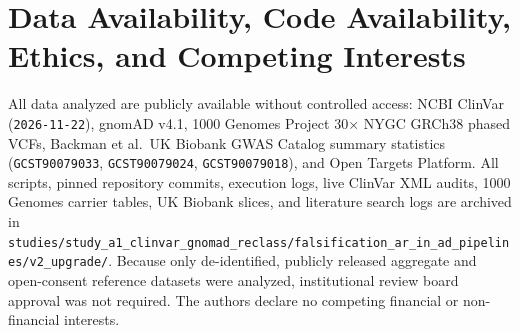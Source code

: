 \documentclass[11pt,letterpaper]{article}
\begin{document}
\section*{Data Availability, Code Availability, Ethics, and Competing Interests}
All data analyzed are publicly available without controlled access: NCBI ClinVar (\texttt{2026-11-22}), gnomAD v4.1, 1000 Genomes Project 30$\times$ NYGC GRCh38 phased VCFs, Backman et al.\ UK Biobank GWAS Catalog summary statistics (\texttt{GCST90079033}, \texttt{GCST90079024}, \texttt{GCST90079018}), and Open Targets Platform. All scripts, pinned repository commits, execution logs, live ClinVar XML audits, 1000 Genomes carrier tables, UK Biobank slices, and literature search logs are archived in \texttt{studies/\allowbreak study\_a1\_clinvar\_gnomad\_reclass/\allowbreak falsification\_ar\_in\_ad\_pipelines/\allowbreak v2\_upgrade/}. Because only de-identified, publicly released aggregate and open-consent reference datasets were analyzed, institutional review board approval was not required. The authors declare no competing financial or non-financial interests.

{\small


}
\end{document}
